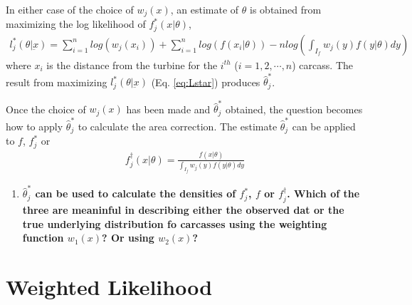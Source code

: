 \documentclass{westarticle}
\begin{document}
In either case of the choice of $w_j(x)$, an estimate of $\theta$ is
obtained from maximizing the log likelihood of $f_j^*(x|\theta)$,
\begin{align}
  \label{eq:Lstar}
l_j^*(\theta | \underbar{x})= \sum_{i=1}^{n}log(w_j(x_i)) +
  \sum_{i=1}^{n}log(f(x_i|\theta)) - nlog(\int_{I_f} w_j(y)f(y|\theta)dy)
\end{align}
where $x_i$ is the distance from the turbine for the $i^{th}$
($i=1,2,\cdots,n$) carcass. The result from maximizing
$l_j^*(\theta|\underbar{x})$ (Eq. \ref{eq:Lstar}) produces $\hat\theta_j^*$.


Once the choice of $w_j(x)$ has been made and $\hat\theta_j^*$ obtained,
the question becomes how to apply $\hat\theta_j^*$ to calculate the area
correction. The estimate $\hat\theta_j^*$ can be applied to $f$, $f^*_j$
or
\begin{align}
  \label{eq:fdagger}
f_j^{\dagger}(x|\theta) = \frac{f(x|\theta)}{\int_{I_f} w_j(y)f(y|\theta)dy}
\end{align}


\begin{enumerate}[label=\bf{Q\arabic*:},resume]
  
\item \bf{$\hat\theta_j^*$ can be used to calculate the densities of
    $f_j^*$, $f$ or $f_j^{\dagger}$. Which of the three are meaninful
    in describing either the observed dat or the true underlying
    distribution fo carcasses using the weighting function $w_1(x)$?
    Or using $w_2(x)$?}
\end{enumerate}

\section{Weighted Likelihood}
\end{document}
